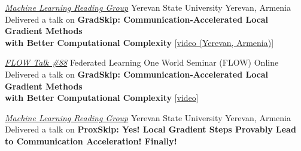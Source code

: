\documentclass[10pt,a4paper,sans]{moderncv}        %
\newcommand{\yerevan}{Yerevan, Armenia}
\newcommand{\ysu}{Yerevan State University}
\begin{document}
  {\textcolor{accent}{\href{https://groups.google.com/g/ml-reading-group-yerevan/c/F_1OGqeFImY/m/BGDIqZAWBQAJ}{\textit{Machine Learning Reading Group}}}}
  {\ysu}
  {\yerevan}
  {}
  {
    Delivered a talk on \textbf{GradSkip: Communication-Accelerated Local Gradient Methods \\ with Better Computational Complexity} [{\textcolor{orange}{\href{https://www.youtube.com/watch?v=w9iHPgE82oo}{video (\yerevan)}}}]
  }


  {\textcolor{accent}{\href{https://sites.google.com/view/one-world-seminar-series-flow/archive/2022?authuser=0\#h.99nho9x1b8ju}{\textit{FLOW Talk \#88}}}}
  {Federated Learning One World Seminar (FLOW)}
  {Online}
  {}
  {
    Delivered a talk on \textbf{GradSkip: Communication-Accelerated Local Gradient Methods \\ with Better Computational Complexity} [{\textcolor{orange}{\href{https://youtu.be/WWhY5tO-FiM}{video}}}]
  }

  {\textcolor{accent}{\href{https://groups.google.com/g/ml-reading-group-yerevan/c/-TZmYEWATuI}{\textit{Machine Learning Reading Group}}}}
  {\ysu}
  {\yerevan}
  {}
  {
    Delivered a talk on \textbf{ProxSkip: Yes! Local Gradient Steps Provably Lead \\ to Communication Acceleration! Finally!}
  }


\end{document}
